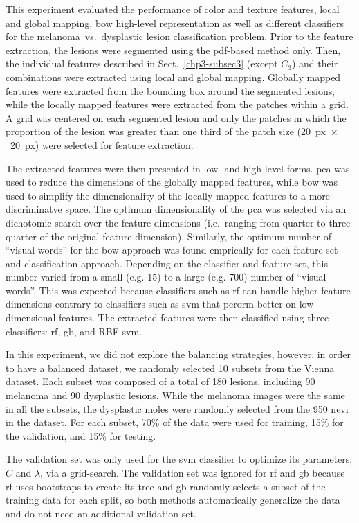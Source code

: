 This experiment evaluated the performance of color and texture features, local and global mapping, \ac{bow} high-level representation as well as different classifiers for the melanoma~vs.~dysplastic lesion classification problem. 
Prior to the feature extraction, the lesions were segmented using the pdf-based method only. 
Then, the individual features described in Sect.~\ref{chp3-subsec3} (except $C_{3}$) and their combinations were extracted using local and global mapping. 
Globally mapped features were extracted from the bounding box around the segmented lesions, while the locally mapped features were extracted from the patches within a grid. 
A grid was centered on each segmented lesion and only the patches in which the proportion of the lesion was greater than one third of the patch size (20~\si{px}~$\times$~20~\si{px}) were selected for feature extraction.

The extracted features were then presented in low- and high-level forms.
\ac{pca} was used to reduce the dimensions of the globally mapped features, while \ac{bow} was used to simplify the dimensionality of the locally mapped features to a more discriminatve space.
The optimum dimensionality of the \ac{pca} was selected via an dichotomic search over the feature dimensions (i.e.~ranging from quarter to three quarter of the original feature dimension).
Similarly, the optimum number of ``visual words'' for the \ac{bow} approach was found emprically for each feature set and classification approach.
Depending on the classifier and feature set, this number varied from a small (e.g. 15) to a large (e.g. 700) number of ``visual words''. 
This was expected because classifiers such as \ac{rf} can handle higher feature dimensions contrary to classifiers such as \ac{svm} that perorm better on low-dimensional features.
The extracted features were then classified using three classifiers: \ac{rf}, \ac{gb}, and RBF-\ac{svm}.
 
In this experiment, we did not explore the balancing strategies, however, in order to have a balanced dataset, we randomly selected 10 subsets from the Vienna dataset.
Each subset was composed of a total of 180 lesions, including 90 melanoma and 90 dysplastic lesions.
While the melanoma images were the same in all the subsets, the dysplastic moles were randomly selected from the 950 nevi in the dataset. 
For each subset, 70\% of the data were used for training, 15\% for the validation, and 15\% for testing.

The validation set was only used for the \ac{svm} classifier to optimize its parameters, $C$ and $\lambda$, via a grid-search. 
The validation set was ignored for \ac{rf} and \ac{gb} because \ac{rf} uses bootstraps to create its tree and \ac{gb} randomly selects a subset of the training data for each split, so both methods automatically generalize the data and do not need an additional validation set.

